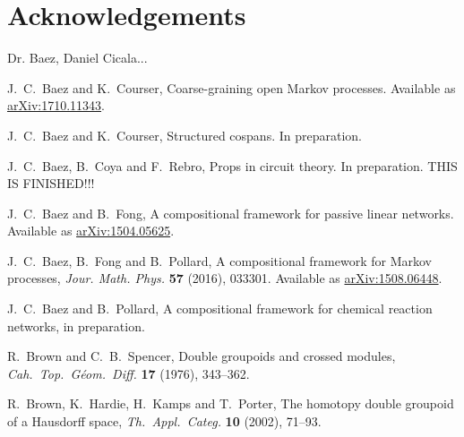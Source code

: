 \documentclass{amsart}
\begin{document}
\section{Acknowledgements}
Dr. Baez, Daniel Cicala...
\begin{thebibliography}{100}

 J.\ C.\ Baez and K.\ Courser, Coarse-graining open Markov processes. Available as \href{https://arxiv.org/abs/1710.11343}{arXiv:1710.11343}.

 J.\ C.\ Baez and K.\ Courser, Structured cospans. In preparation.

 J.\ C.\ Baez, B.\ Coya and F.\ Rebro, Props in circuit theory. In preparation. THIS IS FINISHED!!!

 J.\ C.\ Baez and B.\ Fong, A compositional framework for passive linear networks. Available as \href{http://arxiv.org/abs/1504.05625}{arXiv:1504.05625}.

 J.\ C.\ Baez, B.\ Fong and B.\ Pollard, A compositional framework for Markov processes, \textsl{Jour. Math. Phys.} \textbf{57} (2016), 033301. Available as \href{http://arxiv.org/abs/1508.06448}{arXiv:1508.06448}.

 J.\ C.\ Baez and B.\ Pollard, A compositional framework for chemical reaction networks, in preparation.

 R.\ Brown and C.\ B.\ Spencer, Double groupoids and crossed modules, 
\textsl{Cah.\ Top.\ G\'eom.\ Diff.} \textbf{17} (1976), 343--362.

 R.\ Brown, K.\ Hardie, H.\ Kamps and T.\ Porter, The homotopy double groupoid of a Hausdorff space, \textsl{Th.\ Appl.\ Categ.} \textbf{10} (2002), 71--93.






\end{thebibliography}
\end{document}
